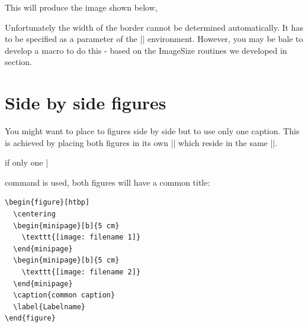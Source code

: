 \begin{teX}
\begin{figure}[htbp]
  \centering
\end{figure}
\end{teX}

This will produce the image shown below,

\begin{center}
\begin{figure}[htbp]
  \centering
\end{figure}
\end{center}


Unfortunately the width of the border cannot be determined automatically. It has to be specified as a parameter of the |\minipage| environment. However, you may be bale to develop a macro to do this - based on the ImageSize routines we developed in section.


\section{Side by side figures}

You might want to place to figures side by side but to use only one caption. This is achieved by placing both figures in its own |\minipage| which reside in the same |\figure|.

if only one |\caption| command is used, both figures will have a common title:

\medskip
\begin{verbatim}
\begin{figure}[htbp]
  \centering
  \begin{minipage}[b]{5 cm}
    \texttt{[image: filename 1]}  
  \end{minipage}
  \begin{minipage}[b]{5 cm}
    \texttt{[image: filename 2]}  
  \end{minipage}
  \caption{common caption}
  \label{Labelname}
\end{figure}
\end{verbatim}
\medskip

